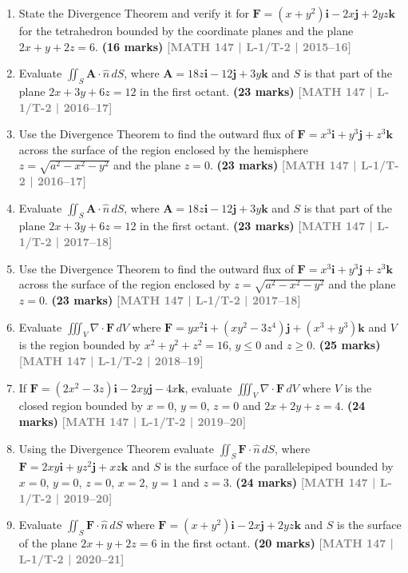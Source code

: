 \documentclass[12pt,a4paper]{article}
\newcommand{\yr}[1]{\hfill\textcolor{gray}{\small\textbf{[#1]}}}
\newcommand{\mk}[1]{\textcolor{orange!70!black}{\small\textbf{(#1 marks)}}}
\begin{document}
\begin{enumerate}

\item State the Divergence Theorem and verify it for $\mathbf{F}=(x+y^{2})\mathbf{i}-2x\mathbf{j}+2yz\mathbf{k}$ for the tetrahedron bounded by the coordinate planes and the plane $2x+y+2z=6$.
\mk{16} \yr{MATH 147 | L-1/T-2 | 2015--16}

\item Evaluate $\displaystyle\iint_{S}\mathbf{A}\cdot\hat{n}\,dS$, where $\mathbf{A}=18z\mathbf{i}-12\mathbf{j}+3y\mathbf{k}$ and $S$ is that part of the plane $2x+3y+6z=12$ in the first octant.
\mk{23} \yr{MATH 147 | L-1/T-2 | 2016--17}

\item Use the Divergence Theorem to find the outward flux of $\mathbf{F}=x^{3}\mathbf{i}+y^{3}\mathbf{j}+z^{3}\mathbf{k}$ across the surface of the region enclosed by the hemisphere $z=\sqrt{a^{2}-x^{2}-y^{2}}$ and the plane $z=0$.
\mk{23} \yr{MATH 147 | L-1/T-2 | 2016--17}

\item Evaluate $\displaystyle\iint_{S}\mathbf{A}\cdot\hat{n}\,dS$, where $\mathbf{A}=18z\mathbf{i}-12\mathbf{j}+3y\mathbf{k}$ and $S$ is that part of the plane $2x+3y+6z=12$ in the first octant.
\mk{23} \yr{MATH 147 | L-1/T-2 | 2017--18}

\item Use the Divergence Theorem to find the outward flux of $\mathbf{F}=x^{3}\mathbf{i}+y^{3}\mathbf{j}+z^{3}\mathbf{k}$ across the surface of the region enclosed by $z=\sqrt{a^{2}-x^{2}-y^{2}}$ and the plane $z=0$.
\mk{23} \yr{MATH 147 | L-1/T-2 | 2017--18}

\item Evaluate $\displaystyle\iiint_{V}\nabla\cdot\mathbf{F}\,dV$ where $\mathbf{F}=yx^{2}\mathbf{i}+(xy^{2}-3z^{4})\mathbf{j}+(x^{3}+y^{3})\mathbf{k}$ and $V$ is the region bounded by $x^{2}+y^{2}+z^{2}=16$, $y\le 0$ and $z\ge 0$.
\mk{25} \yr{MATH 147 | L-1/T-2 | 2018--19}

\item If $\mathbf{F}=(2x^{2}-3z)\mathbf{i}-2xy\mathbf{j}-4x\mathbf{k}$, evaluate $\displaystyle\iiint_{V}\nabla\cdot\mathbf{F}\,dV$ where $V$ is the closed region bounded by $x=0$, $y=0$, $z=0$ and $2x+2y+z=4$.
\mk{24} \yr{MATH 147 | L-1/T-2 | 2019--20}

\item Using the Divergence Theorem evaluate $\displaystyle\iint_{S}\mathbf{F}\cdot\hat{n}\,dS$, where $\mathbf{F}=2xy\mathbf{i}+yz^{2}\mathbf{j}+xz\mathbf{k}$ and $S$ is the surface of the parallelepiped bounded by $x=0$, $y=0$, $z=0$, $x=2$, $y=1$ and $z=3$.
\mk{24} \yr{MATH 147 | L-1/T-2 | 2019--20}

\item Evaluate $\displaystyle\iint_{S}\mathbf{F}\cdot\hat{n}\,dS$ where $\mathbf{F}=(x+y^{2})\mathbf{i}-2x\mathbf{j}+2yz\mathbf{k}$ and $S$ is the surface of the plane $2x+y+2z=6$ in the first octant.
\mk{20} \yr{MATH 147 | L-1/T-2 | 2020--21}

\end{enumerate}
\end{document}
